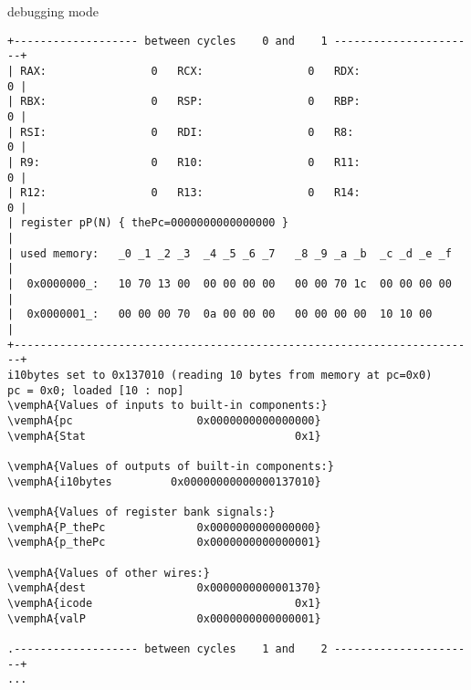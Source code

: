 
\begin{frame}[fragile,label=debugNopJmp]{debugging mode}
\begin{Verbatim}[fontsize=\fontsize{8}{9}\selectfont,commandchars=\\\{\}]
+------------------- between cycles    0 and    1 ----------------------+
| RAX:                0   RCX:                0   RDX:                0 |
| RBX:                0   RSP:                0   RBP:                0 |
| RSI:                0   RDI:                0   R8:                 0 |
| R9:                 0   R10:                0   R11:                0 |
| R12:                0   R13:                0   R14:                0 |
| register pP(N) { thePc=0000000000000000 }                             |
| used memory:   _0 _1 _2 _3  _4 _5 _6 _7   _8 _9 _a _b  _c _d _e _f    |
|  0x0000000_:   10 70 13 00  00 00 00 00   00 00 70 1c  00 00 00 00    |
|  0x0000001_:   00 00 00 70  0a 00 00 00   00 00 00 00  10 10 00       |
+-----------------------------------------------------------------------+
i10bytes set to 0x137010 (reading 10 bytes from memory at pc=0x0)
pc = 0x0; loaded [10 : nop]
\vemphA{Values of inputs to built-in components:}
\vemphA{pc                   0x0000000000000000}
\vemphA{Stat                                0x1}

\vemphA{Values of outputs of built-in components:}
\vemphA{i10bytes         0x00000000000000137010}

\vemphA{Values of register bank signals:}
\vemphA{P_thePc              0x0000000000000000}
\vemphA{p_thePc              0x0000000000000001}

\vemphA{Values of other wires:}
\vemphA{dest                 0x0000000000001370}
\vemphA{icode                               0x1}
\vemphA{valP                 0x0000000000000001}

.------------------- between cycles    1 and    2 ----------------------+
...
\end{Verbatim}
\end{frame}

